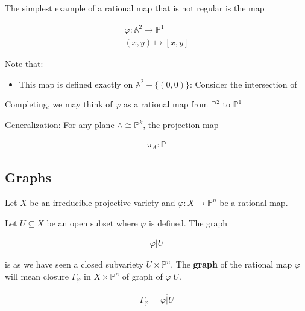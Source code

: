 \documentclass[Total.tex]{subfiles}
\begin{document}
		\begin{example}
			The simplest example of a rational map that is not regular is the map
			
			\begin{gather*}
				\varphi:\mathbb{A}^2\rightarrow \mathbb{P}^1\\
				(x,y)\mapsto [x,y]
			\end{gather*}
			
			Note that: 
			
			\begin{itemize}
				\item This map is defined exactly on $\mathbb{A}^2-\{(0,0)\}$: Consider the intersection of 
				
			\end{itemize}
			
			Completing, we may think of $\varphi$ as a rational map from $\mathbb{P}^2$ to $\mathbb{P}^1$
		\end{example}
		
		\begin{example}
			Generalization: For any plane $\wedge\cong \mathbb{P}^k$, the projection map 
			
			\begin{gather*}
				\pi_A:\mathbb{P}
			\end{gather*}
		\end{example}
		
		\subsection{Graphs}
		
		
		\begin{Def}
			Let $X$ be an irreducible projective variety and $\varphi:X\rightarrow \mathbb{P}^n$ be a rational map.
			
			Let $U\subseteq X$ be an open subset where $\varphi$ is defined. The graph
			
			\begin{gather*}
				\varphi|U
			\end{gather*}
			
			is as we have seen a closed subvariety $U\times \mathbb{P}^n$. The \textbf{graph} of the rational map $\varphi$ will mean closure $\Gamma_\varphi$ in $X\times \mathbb{P}^n$ of graph of $\varphi|U$.
			
			\begin{gather*}
				\Gamma_\varphi=\overline{\varphi|U}
			\end{gather*}
		\end{Def}
		
\end{document}
